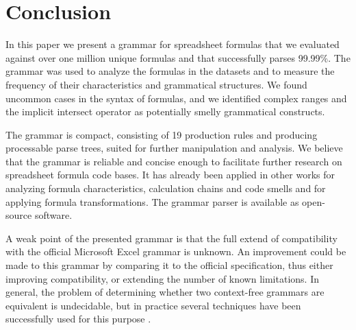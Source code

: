 \documentclass[conference]{IEEEtran}
\begin{document}
\section{Conclusion}
\label{section:conclusion}
In this paper we present a grammar for spreadsheet formulas that we evaluated against over one million unique formulas and that successfully parses 99.99\%. The grammar was used to analyze the formulas in the datasets and to measure the frequency of their characteristics and grammatical structures. We found uncommon cases in the syntax of formulas, and we identified complex ranges and the implicit intersect operator as potentially smelly grammatical constructs.

The grammar is compact, consisting of 19 production rules and producing processable parse trees, suited for further manipulation and analysis. We believe that the grammar is reliable and concise enough to facilitate further research on spreadsheet formula code bases. It has already been applied in other works for analyzing formula characteristics, calculation chains and code smells and for applying formula transformations. The grammar parser is available as open-source software.

A weak point of the presented grammar is that the full extend of compatibility with the official Microsoft Excel grammar is unknown.
An improvement could be made to this grammar by comparing it to the official specification, thus either improving compatibility, or extending the number of known limitations.
In general, the problem of determining whether two context-free grammars are equivalent is undecidable, but in practice several techniques have been successfully used for this purpose \cite{lammel2009introduction,fischer2012comparison}.




\end{document}
